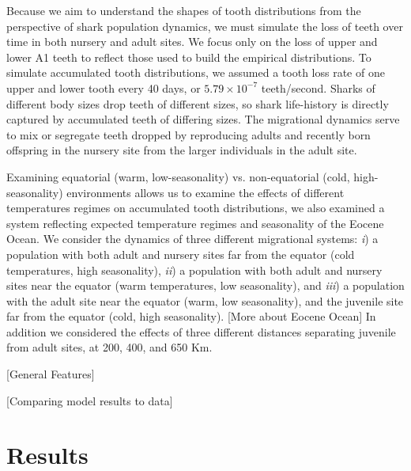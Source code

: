\documentclass[]{rsos}%
\begin{document}
Because we aim to understand the shapes of tooth distributions from the perspective of shark population dynamics, we must simulate the loss of teeth over time in both nursery and adult sites.
We focus only on the loss of upper and lower A1 teeth to reflect those used to build the empirical distributions.
To simulate accumulated tooth distributions, we assumed a tooth loss rate of one upper and lower tooth every 40 days, or $5.79\times 10^{-7}$ teeth/second.
Sharks of different body sizes drop teeth of different sizes, so shark life-history is directly captured by accumulated teeth of differing sizes.
The migrational dynamics serve to mix or segregate teeth dropped by reproducing adults and recently born offspring in the nursery site from the larger individuals in the adult site.



Examining equatorial (warm, low-seasonality) vs. non-equatorial (cold, high-seasonality) environments allows us to examine the effects of different temperatures regimes on accumulated tooth distributions, we also examined a system reflecting expected temperature regimes and seasonality of the Eocene Ocean.
We consider the dynamics of three different migrational systems: 
\emph{i}) a population with both adult and nursery sites far from the equator (cold temperatures, high seasonality),
\emph{ii}) a population with both adult and nursery sites near the equator (warm temperatures, low seasonality), and
\emph{iii}) a population with the adult site near the equator (warm, low seasonality), and the juvenile site far from the equator (cold, high seasonality).
[More about Eocene Ocean]
In addition we considered the effects of three different distances separating juvenile from adult sites, at 200, 400, and 650 Km.

[General Features]

[Comparing model results to data]



\section{Results}
\end{document}
